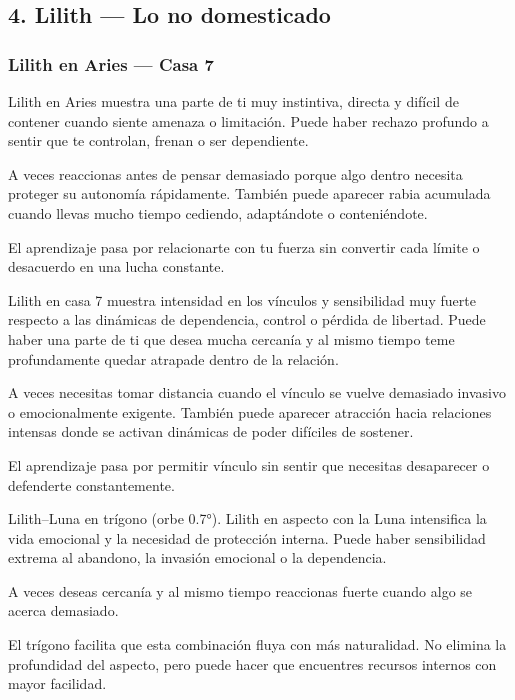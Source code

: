 \documentclass[11pt,a4paper]{article}
\begin{document}
\vspace{0.4cm}

\subsection{4. Lilith — Lo no domesticado}

\subsubsection*{Lilith en Aries — Casa 7}

Lilith en Aries muestra una parte de ti muy instintiva, directa y difícil de contener cuando siente amenaza o limitación. Puede haber rechazo profundo a sentir que te controlan, frenan o ser dependiente.

A veces reaccionas antes de pensar demasiado porque algo dentro necesita proteger su autonomía rápidamente. También puede aparecer rabia acumulada cuando llevas mucho tiempo cediendo, adaptándote o conteniéndote.

El aprendizaje pasa por relacionarte con tu fuerza sin convertir cada límite o desacuerdo en una lucha constante.

Lilith en casa 7 muestra intensidad en los vínculos y sensibilidad muy fuerte respecto a las dinámicas de dependencia, control o pérdida de libertad. Puede haber una parte de ti que desea mucha cercanía y al mismo tiempo teme profundamente quedar atrapade dentro de la relación.

A veces necesitas tomar distancia cuando el vínculo se vuelve demasiado invasivo o emocionalmente exigente. También puede aparecer atracción hacia relaciones intensas donde se activan dinámicas de poder difíciles de sostener.

El aprendizaje pasa por permitir vínculo sin sentir que necesitas desaparecer o defenderte constantemente.

Lilith–Luna en trígono (orbe 0.7°).
Lilith en aspecto con la Luna intensifica la vida emocional y la necesidad de protección interna. Puede haber sensibilidad extrema al abandono, la invasión emocional o la dependencia.

A veces deseas cercanía y al mismo tiempo reaccionas fuerte cuando algo se acerca demasiado.

El trígono facilita que esta combinación fluya con más naturalidad. No elimina la profundidad del aspecto, pero puede hacer que encuentres recursos internos con mayor facilidad.
\end{document}
